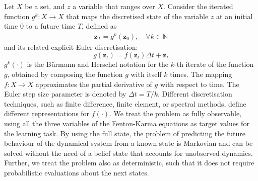 \documentclass[utf8]{frontiersSCNS} %
\begin{document}
Let $X$ be a set, and $z$ a variable that ranges over $X$.
Consider the iterated function $g^k: X  \rightarrow X$ that maps the discretised state of the variable $z$ at an initial time $0$ to a future time $T$, defined as
\begin{align}\label{eq:u}
    \mathbf{z}_{T} = g^{k}(\mathbf{z}_{0}), \quad \forall k \in \mathbb{N}
\end{align}
and its related explicit Euler discretisation:
\begin{equation}\label{eq:g}
    g(\mathbf{z}_{t}) = f(\mathbf{z}_{t})\Delta t + \mathbf{z}_{t}
\end{equation}
$g^k(\cdot)$ is the Bürmann and Herschel notation for the $k$-th iterate of the function $g$, obtained by composing the function $g$ with itself $k$ times. The mapping $f: X \rightarrow X$ approximates the partial derivative of $g$ with respect to time. The Euler step size parameter is denoted by $\Delta t = T/k$.
Different discretisation techniques, such as finite difference, finite element, or spectral methods, define different representations for $f(\cdot)$.
%
We treat the problem as fully observable, using all the three variables of the Fenton-Karma equations as target values for the learning task.
By using the full state, the problem of predicting the future behaviour of the dynamical system from a known state is Markovian and can be solved without the need of a belief state that accounts for unobserved dynamics.
Further, we treat the problem also as deterministic, such that it does not require probabilistic evaluations about the next states.
\end{document}
